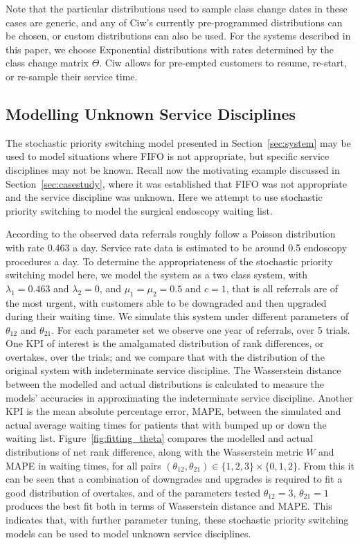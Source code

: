 \documentclass{article}
\begin{document}
Note that the particular distributions used to sample class change dates in
these cases are generic, and any of Ciw's currently pre-programmed distributions
can be chosen, or custom distributions can also be used. For the systems
described in this paper, we choose Exponential distributions with rates
determined by the class change matrix $\Theta$. Ciw allows for 
pre-empted customers to resume, re-start, or re-sample their service time.

\subsection{Modelling Unknown Service Disciplines}\label{sec:modelling}
The stochastic priority switching model presented in Section~\ref{sec:system}
may be used to model situations where FIFO is not appropriate, but specific
service disciplines may not be known. Recall now the motivating example
discussed in Section~\ref{sec:casestudy}, where it was established that FIFO was
not appropriate and the service discipline was unknown. Here we attempt to use
stochastic priority switching to model the surgical endoscopy waiting list.

According to the observed data referrals roughly follow a Poisson distribution
with rate 0.463 a day. Service rate data is estimated to be around 0.5
endoscopy procedures a day. To determine the appropriateness of the stochastic
priority switching model here, we model the system as a two class system, with
$\lambda_1 = 0.463$ and $\lambda_2 = 0$, and $\mu_1 = \mu_2 = 0.5$ and $c = 1$,
that is all referrals are of the most urgent, with customers able to be
downgraded and then upgraded during their waiting time. We simulate this
system under different parameters of $\theta_{12}$ and $\theta_{21}$. For each
parameter set we observe one year of referrals, over 5 trials. One KPI of
interest is the amalgamated distribution of rank differences, or overtakes,
over the trials; and we compare that with the
distribution of the original system with indeterminate service discipline. The
Wasserstein distance \cite{mostafaei11} between the modelled and actual
distributions is calculated to measure the models' accuracies in approximating
the indeterminate service discipline.
Another KPI is the mean absolute percentage error, MAPE, between the simulated
and actual average waiting times for patients that with bumped up or down the
waiting list.
Figure~\ref{fig:fitting_theta} compares the modelled and actual distributions of
net rank difference, along with the Wasserstein metric $W$ and MAPE in waiting
times, for all pairs
$\left(\theta_{12}, \theta_{21}\right) \in \{1, 2, 3\}\times\{0, 1, 2\}$. From
this it can be seen that a combination of downgrades and upgrades is required to
fit a good distribution of overtakes, and of the parameters tested
$\theta_{12}=3$, $\theta_{21}=1$ produces the best fit both in terms of
Wasserstein distance and MAPE. This indicates that, with further parameter
tuning, these stochastic priority switching models can be used to model unknown
service disciplines.
\end{document}
